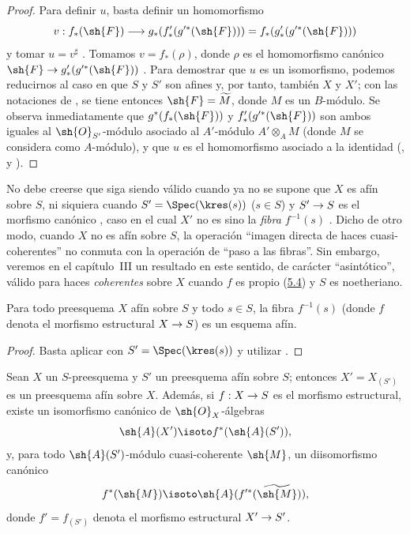 \documentclass[oneside,10pt]{amsart}
\makeatletter
\newcommand{\ega@arrow}[2]{\mathchoice{#1}{#2}{#2}{#2}}
\renewcommand{\to}{\ega@arrow{\longrightarrow}{\rightarrow}}
\newcommand{\oldpage}[2][]{\marginnote{\normalfont\footnotesize\textbf{#1}~|~#2}\ignorespaces}
\let\EGAOriginalLabel\label
\renewcommand{\label}[1]{\phantomsection\EGAOriginalLabel{#1}}
\makeatother
\begin{document}
\begin{proof}
Para definir $u$, basta definir un homomorfismo
\[
  v:f_*(\sh{F})\longrightarrow
  g_*(f'_*(g^{\prime*}(\sh{F})))
  =f_*(g'_*(g^{\prime*}(\sh{F})))
\]
y tomar $u=v^\sharp$ .
Tomamos $v=f_*(\rho)$, donde $\rho$ es el homomorfismo canónico $\sh{F}\to g'_*(g^{\prime*}(\sh{F}))$ .
Para demostrar que $u$ es un isomorfismo, podemos reducirnos al caso en que $S$ y $S'$ son afines y, por tanto, también $X$ y $X'$; con las notaciones de , se tiene entonces $\sh{F}=\widetilde{M}$, donde $M$ es un $B$-módulo.
Se observa inmediatamente que $g^*(f_*(\sh{F}))$ y $f'_*(g^{\prime*}(\sh{F}))$ son ambos iguales al $\sh{O}_{S'}$-módulo asociado al $A'$-módulo $A'\otimes_A M$ (donde $M$ se considera como $A$-módulo), y que $u$ es el homomorfismo asociado a la identidad (,  y ).
\end{proof}

\begin{remark}[1.5.3]
\label{II.1.5.3}
No debe creerse que  siga siendo válido cuando ya no se supone que $X$ es afín sobre $S$, ni siquiera cuando $S'=\Spec(\kres(s))$ ($s\in S$) y $S'\to S$ es el morfismo canónico , caso en el cual $X'$ no es sino la \emph{fibra $f^{-1}(s)$} .
Dicho de otro modo, cuando $X$ no es afín sobre $S$, la operación
\oldpage[II]{13}
``imagen directa de haces cuasi-coherentes'' no conmuta con la operación de ``paso a las fibras''.
Sin embargo, veremos en el capítulo~III  un resultado en este sentido, de carácter ``asintótico'', válido para haces \emph{coherentes} sobre $X$ cuando $f$ es propio (\hyperref[subsection:II.5.4]{5.4}) y $S$ es noetheriano.
\end{remark}

\begin{corollary}[1.5.4]
\label{II.1.5.4}
Para todo preesquema $X$ afín sobre $S$ y todo $s\in S$, la fibra $f^{-1}(s)$ (donde $f$ denota el morfismo estructural $X\to S$) es un esquema afín.
\end{corollary}

\begin{proof}
Basta aplicar  con $S'=\Spec(\boldsymbol{\kres}(s))$ y utilizar .
\end{proof}

\begin{corollary}[1.5.5]
\label{II.1.5.5}
Sean $X$ un $S$-preesquema y $S'$ un preesquema afín sobre $S$; entonces $X'=X_{(S')}$ es un preesquema afín sobre $X$.
Además, si $f:X\to S$ es el morfismo estructural, existe un isomorfismo canónico de $\sh{O}_X$-álgebras
\[
  \sh{A}(X')\isoto f^*(\sh{A}(S')),
\]
y, para todo $\sh{A}(S')$-módulo cuasi-coherente $\sh{M}$, un diisomorfismo canónico
\[
  f^*(\sh{M})\isoto\sh{A}(f^{\prime*}(\widetilde{\sh{M}})),
\]
donde $f'=f_{(S')}$ denota el morfismo estructural $X'\to S'$.
\end{corollary}
\end{document}
